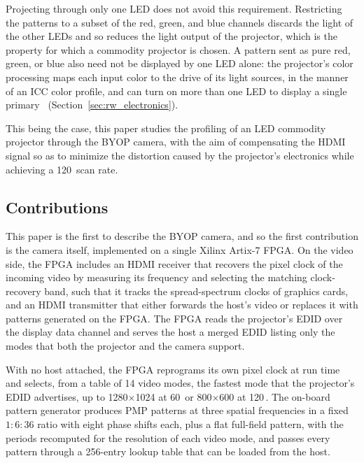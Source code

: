 \documentclass[10pt,journal,compsoc]{IEEEtran}
\newcommand{\SI}[2]{#1\,#2}
\begin{document}
Projecting through only one LED does not avoid this requirement. Restricting the patterns to a
subset of the red, green, and blue channels discards the light of the other LEDs and so reduces
the light output of the projector, which is the property for which a commodity projector is
chosen. A pattern sent as pure red, green, or blue also need not be displayed by one LED alone:
the projector's color processing maps each input color to the drive of its light sources, in the
manner of an ICC color profile, and can turn on more than one LED to display a single
primary~\cite{stone2001color,ti_dlpa038} (Section~\ref{sec:rw_electronics}).

This being the case, this paper studies the profiling of an LED commodity projector through the
BYOP camera, with the aim of compensating the HDMI signal so as to minimize the distortion caused
by the projector's electronics while achieving a \SI{120}{\hertz} scan rate.

\subsection{Contributions}
This paper is the first to describe the BYOP camera, and so the first contribution is the camera
itself, implemented on a single Xilinx Artix-7 FPGA. On the video side, the FPGA includes an HDMI
receiver that recovers the pixel clock of the incoming video by measuring its frequency and
selecting the matching clock-recovery band, such that it tracks the spread-spectrum clocks of
graphics cards, and an HDMI transmitter that either forwards the host's video or replaces it with
patterns generated on the FPGA. The FPGA reads the projector's EDID over the display data channel
and serves the host a merged EDID listing only the modes that both the projector and the camera
support.

With no host attached, the FPGA reprograms its own pixel clock at run time and selects,
from a table of 14 video modes, the fastest mode that the projector's EDID advertises, up to
1280$\times$1024 at \SI{60}{\hertz} or 800$\times$600 at \SI{120}{\hertz}. The on-board pattern
generator produces PMP patterns at three spatial frequencies in a fixed $1{:}6{:}36$ ratio with
eight phase shifts each, plus a flat full-field pattern, with the periods recomputed for the
resolution of each video mode, and passes every pattern through a 256-entry lookup table that
can be loaded from the host.
\end{document}
